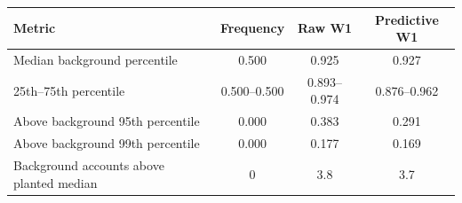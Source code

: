 \begin{tabular}{lccc}
\toprule
Metric & Frequency & Raw W1 & Predictive W1 \\
\midrule
Median background percentile & 0.500 & 0.925 & 0.927 \\
25th--75th percentile & 0.500--0.500 & 0.893--0.974 & 0.876--0.962 \\
Above background 95th percentile & 0.000 & 0.383 & 0.291 \\
Above background 99th percentile & 0.000 & 0.177 & 0.169 \\
Background accounts above planted median & 0 & 3.8 & 3.7 \\
\bottomrule
\end{tabular}
